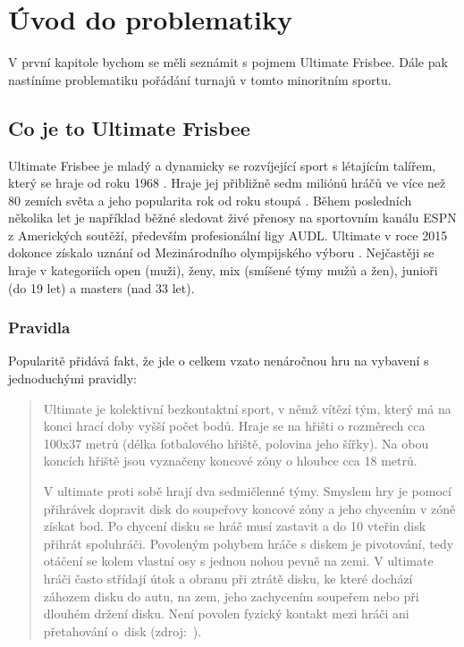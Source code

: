 \chapter{Úvod do problematiky}

V první kapitole bychom se měli seznámit s pojmem Ultimate Frisbee. Dále pak nastíníme
problematiku pořádání turnajů v tomto minoritním sportu.

\section{Co je to Ultimate Frisbee}

Ultimate Frisbee je mladý a dynamicky se rozvíjející sport s létajícím talířem,
který se hraje od roku 1968 \cite{cald-ultimate}. Hraje jej přibližně sedm miliónů
hráčů ve více než 80 zemích světa a jeho popularita rok od roku stoupá \cite{usa-ultimate}.
Během posledních několika let je například běžné sledovat živé přenosy na sportovním kanálu ESPN
z Amerických soutěží, především profesionální ligy AUDL. Ultimate v roce 2015 dokonce získalo
uznání od Mezinárodního olympijského výboru \cite{cald-uznani}. Nejčastěji se hraje v kategoriích
open (muži), ženy, mix (smíšené týmy mužů a žen), junioři (do 19 let) a masters (nad 33 let).

\subsection{Pravidla}

Popularitě přidává fakt, že jde o celkem vzato nenáročnou hru na vybavení s jednoduchými pravidly:

\begin{quote}
Ultimate je kolektivní bezkontaktní sport, v němž vítězí tým, který má na konci hrací doby
vyšší počet bodů. Hraje se na hřišti o rozměrech cca 100x37 metrů (délka fotbalového hřiště,
polovina jeho šířky). Na obou koncích hřiště jsou vyznačeny koncové zóny o hloubce cca 18 metrů.

V ultimate proti sobě hrají dva sedmičlenné týmy. Smyslem hry je pomocí přihrávek dopravit disk
do soupeřovy koncové zóny a jeho chycením v zóně získat bod. Po chycení disku se hráč musí
zastavit a do 10 vteřin disk přihrát spoluhráči. Povoleným pohybem hráče s diskem je pivotování,
tedy otáčení se kolem vlastní osy s jednou nohou pevně na zemi. V ultimate hráči často střídají
útok a obranu při ztrátě disku, ke které dochází záhozem disku do autu, na zem, jeho zachycením
soupeřem nebo při dlouhém držení disku. Není povolen fyzický kontakt mezi hráči ani přetahování
o~disk (zdroj:~\cite{cald-ultimate}).
\end{quote}

